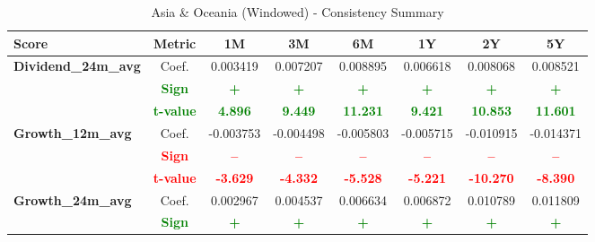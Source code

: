 \documentclass[11pt,english,a4paper,hidelinks]{book}
\begin{document}
\begin{table}[H]
    \centering
    \caption{Asia \& Oceania (Windowed) - Consistency Summary}
    \begin{tabular}{lccccccc}
        \toprule
        \textbf{Score} & \textbf{Metric} & \textbf{1M} & \textbf{3M} & \textbf{6M} & \textbf{1Y} & \textbf{2Y} & \textbf{5Y} \\
        \midrule
        \multirow{3}{*}{\textbf{Dividend\_24m\_avg}} 
        & Coef.   & 0.003419  & 0.007207  & 0.008895  & 0.006618  & 0.008068  & 0.008521  \\
        & \textbf{\textcolor{green}{Sign}}    & \textbf{\textcolor{green}{+}}         & \textbf{\textcolor{green}{+}}         & \textbf{\textcolor{green}{+}}         & \textbf{\textcolor{green}{+}}         & \textbf{\textcolor{green}{+}}         & \textbf{\textcolor{green}{+}}         \\
        & \textbf{\textcolor{green}{t-value}} & \textbf{\textcolor{green}{4.896}}     & \textbf{\textcolor{green}{9.449}}     & \textbf{\textcolor{green}{11.231}}    & \textbf{\textcolor{green}{9.421}}     & \textbf{\textcolor{green}{10.853}}    & \textbf{\textcolor{green}{11.601}}    \\
        \midrule
        \multirow{3}{*}{\textbf{Growth\_12m\_avg}}
        & Coef.   & -0.003753 & -0.004498 & -0.005803 & -0.005715 & -0.010915 & -0.014371 \\
        & \textbf{\textcolor{red}{Sign}}    & \textbf{\textcolor{red}{–}}         & \textbf{\textcolor{red}{–}}         & \textbf{\textcolor{red}{–}}         & \textbf{\textcolor{red}{–}}         & \textbf{\textcolor{red}{–}}         & \textbf{\textcolor{red}{–}}         \\
        & \textbf{\textcolor{red}{t-value}} & \textbf{\textcolor{red}{-3.629}}    & \textbf{\textcolor{red}{-4.332}}    & \textbf{\textcolor{red}{-5.528}}    & \textbf{\textcolor{red}{-5.221}}    & \textbf{\textcolor{red}{-10.270}}   & \textbf{\textcolor{red}{-8.390}}    \\
        \multirow{3}{*}{\textbf{Growth\_24m\_avg}}
            & Coef.   & 0.002967  & 0.004537  & 0.006634  & 0.006872  & 0.010789  & 0.011809  \\
            & \textbf{\textcolor{green}{Sign}}    & \textbf{\textcolor{green}{+}}         & \textbf{\textcolor{green}{+}}         & \textbf{\textcolor{green}{+}}         & \textbf{\textcolor{green}{+}}         & \textbf{\textcolor{green}{+}}         & \textbf{\textcolor{green}{+}}         \\

\end{tabular}
\end{table}
\end{document}
